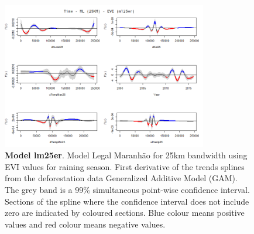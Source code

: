 \begin{table}
\begin{figure}[H]
 \centering
        \centering
        \includegraphics[width=0.8\textwidth]{ml25er.png} %
        \caption[Model Legal Maranhão for 25km bandwidth using EVI values for raining season. First derivative of the trends splines from the deforestation data Generalized Additive Model (GAM)]{\textbf{Model lm25er}. Model Legal Maranhão for 25km bandwidth using EVI values for raining season. First derivative of the trends splines from the deforestation data Generalized Additive Model (GAM). The grey band is a 99\% simultaneous point-wise confidence interval. Sections of the spline where the confidence interval does not include zero are indicated by coloured sections. Blue colour means positive values and red colour means negative values.}
        \centering
\end{figure}
\end{table}


